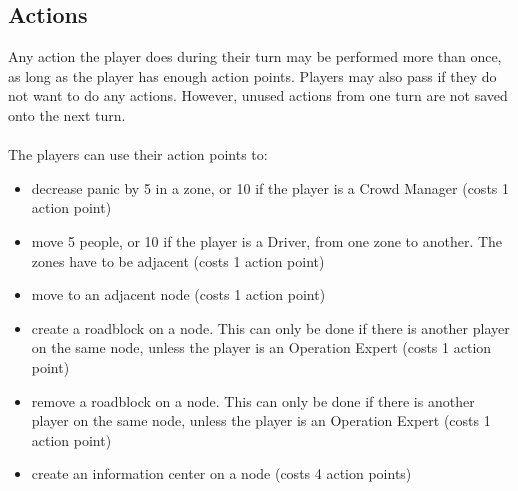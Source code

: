\subsection*{Actions}
Any action the player does during their turn may be performed more than once, as long as the player has enough action points. Players may also pass if they do not want to do any actions. However, unused actions from one turn are not saved onto the next turn.\\
\\
The players can use their action points to:
\begin{itemize}
	\item decrease panic by 5 in a zone, or 10 if the player is a Crowd Manager (costs 1 action point)
	\item move 5 people, or 10 if the player is a Driver, from one zone to another. The zones have to be adjacent (costs 1 action point)
	\item move to an adjacent node (costs 1 action point)
	\item create a roadblock on a node. This can only be done if there is another player on the same node, unless the player is an Operation Expert (costs 1 action point)	
	\item remove a roadblock on a node. This can only be done if there is another player on the same node, unless the player is an Operation Expert (costs 1 action point)	
	\item create an information center on a node (costs 4 action points)
\end{itemize}
%
%
